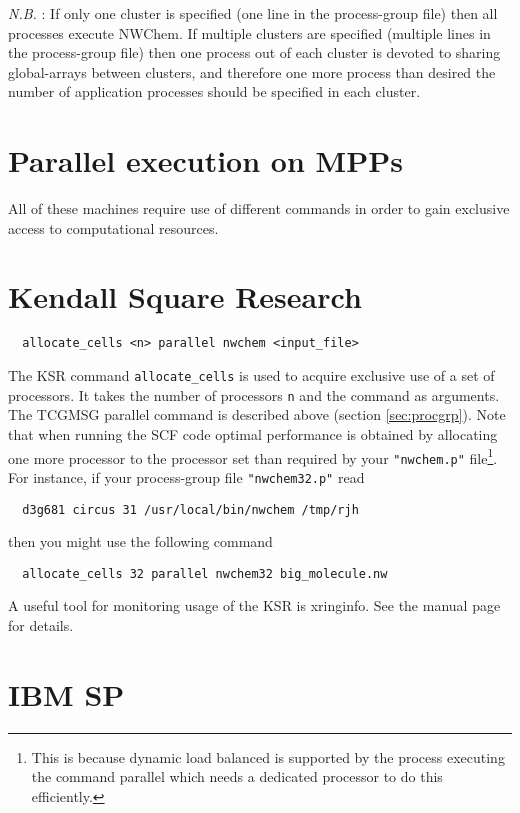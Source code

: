 {\em N.B.} : If only one cluster is specified (one line in the
process-group file) then all processes execute NWChem.  If multiple
clusters are specified (multiple lines in the process-group file)
then one process out of each cluster is devoted to sharing
global-arrays between clusters, and therefore one more process than
desired the number of application processes should be specified in
each cluster.

\section{Parallel execution on MPPs}

All of these machines require use of different commands in order to
gain exclusive access to computational resources.

\section{Kendall Square Research}

\begin{verbatim}
  allocate_cells <n> parallel nwchem <input_file>
\end{verbatim}

The KSR command \verb+allocate_cells+ is used to acquire exclusive use
of a set of processors.  It takes the number of processors \verb+n+ and
the command as arguments.  The TCGMSG parallel command is described
above (section \ref{sec:procgrp}).  Note that when running the SCF
code optimal performance is obtained by allocating one more processor
to the processor set than required by your \verb+"nwchem.p"+
file\footnote{This is because dynamic load balanced is supported by
the process executing the command parallel which needs a dedicated
processor to do this efficiently.}.  For instance, if your
process-group file \verb+"nwchem32.p"+ read
\begin{verbatim}
  d3g681 circus 31 /usr/local/bin/nwchem /tmp/rjh
\end{verbatim}
then you might use the following command
\begin{verbatim}
  allocate_cells 32 parallel nwchem32 big_molecule.nw
\end{verbatim}

A useful tool for monitoring usage of the KSR is xringinfo.  See the
manual page for details.

\section{IBM SP}

